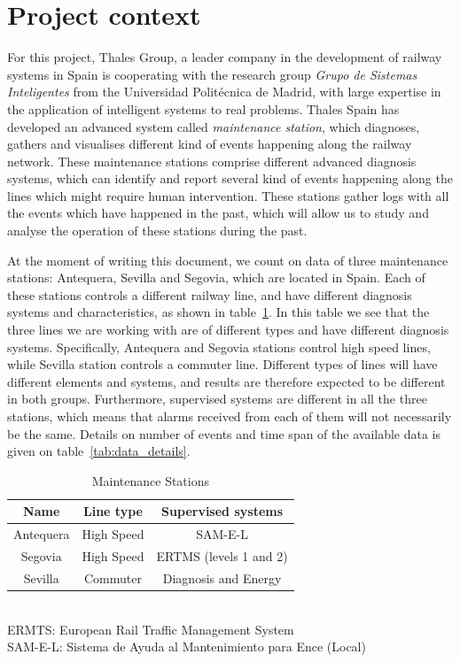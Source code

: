 \documentclass[a4paper,12pt]{article}
\begin{document}
\section{Project context}
For this project, Thales Group, a leader company in the development of railway systems in Spain is cooperating with the research group {\it Grupo de Sistemas Inteligentes} from the Universidad Politécnica de Madrid, with large expertise in the application of intelligent systems to real problems. Thales Spain has developed an advanced system called \emph{maintenance station}, which diagnoses, gathers and visualises different kind of events happening along the railway network. These maintenance stations comprise different advanced diagnosis systems, which can identify and report several kind of events happening along the lines which might require human intervention. These stations gather logs with all the events which have happened in the past, which will allow us to study and analyse the operation of these stations during the past.

At the moment of writing this document, we count on data of three maintenance stations: Antequera, Sevilla and Segovia, which are located in Spain. Each of these stations controls a different railway line, and have different diagnosis systems and characteristics, as shown in table~\ref{tab:stations}. In this table we see that the three lines we are working with are of different types and have different diagnosis systems. Specifically, Antequera and Segovia stations control high speed lines, while Sevilla station controls a commuter line. Different types of lines will have different elements and systems, and results are therefore expected to be different in both groups. Furthermore, supervised systems are different in all the three stations, which means that alarms received from each of them will not necessarily be the same. Details on number of events and time span of the available data is given on table~\ref{tab:data_details}.

\begin{table}
\begin{center}
\begin{tabular}{|c|c|c|}
\hline Name & Line type & Supervised systems \\ 
\hline Antequera & High Speed & SAM-E-L \\ 
\hline Segovia & High Speed & ERTMS (levels 1 and 2) \\ 
\hline Sevilla & Commuter & Diagnosis and Energy \\ 
\hline 
\end{tabular}
\\
\bigskip
ERMTS: European Rail Traffic Management System\\
SAM-E-L: Sistema de Ayuda al Mantenimiento para Ence (Local)\\

\end{center} 
\caption {Maintenance Stations} \label{tab:stations} 
\end{table}
\end{document}
